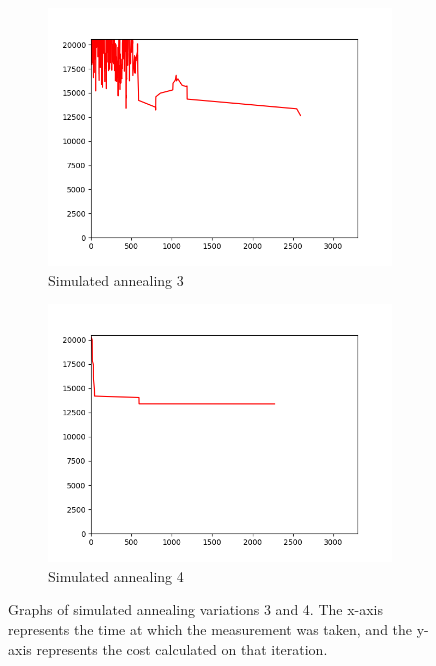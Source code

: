 \documentclass[11pt]{article}
\begin{document}
\begin{figure}[h!]
  \centering
  \begin{subfigure}[b]{0.4\linewidth}
    \includegraphics[width=\linewidth]{graph_simulated_annealing_3.png}
    \caption*{Simulated annealing 3}
  \end{subfigure}
  \begin{subfigure}[b]{0.4\linewidth}
    \includegraphics[width=\linewidth]{graph_simulated_annealing_4.png}
    \caption*{Simulated annealing 4}
  \end{subfigure}
  \caption{Graphs of simulated annealing variations 3 and 4. The x-axis represents the time at which the measurement was taken, and the y-axis represents the cost calculated on that iteration.}
\end{figure}
\clearpage
\end{document}
